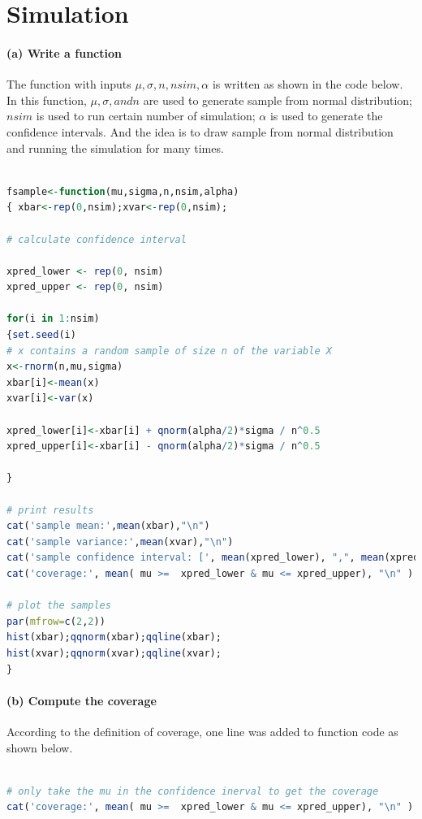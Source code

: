 \documentclass[10pt, letterpaper]{proc}
\begin{document}
\section{Simulation}
\paragraph{(a) Write a function} The function with inputs $\mu, \sigma, n, nsim, \alpha$ is written as shown in the code below. In this function, $\mu, \sigma, and n$ are used to generate sample from normal distribution; $nsim$ is used to run certain number of simulation; $\alpha$ is used to generate the confidence intervals. And the idea is to draw sample from normal distribution and running the simulation for many times.

\begin{lstlisting}[language=R, breaklines=T, basicstyle=\footnotesize\ttfamily]

fsample<-function(mu,sigma,n,nsim,alpha)
{ xbar<-rep(0,nsim);xvar<-rep(0,nsim); 

# calculate confidence interval

xpred_lower <- rep(0, nsim)
xpred_upper <- rep(0, nsim)

for(i in 1:nsim)
{set.seed(i)
# x contains a random sample of size n of the variable X
x<-rnorm(n,mu,sigma)
xbar[i]<-mean(x)
xvar[i]<-var(x)

xpred_lower[i]<-xbar[i] + qnorm(alpha/2)*sigma / n^0.5
xpred_upper[i]<-xbar[i] - qnorm(alpha/2)*sigma / n^0.5

}

# print results
cat('sample mean:',mean(xbar),"\n")
cat('sample variance:',mean(xvar),"\n")
cat('sample confidence interval: [', mean(xpred_lower), ",", mean(xpred_upper), "] \n")
cat('coverage:', mean( mu >=  xpred_lower & mu <= xpred_upper), "\n" )

# plot the samples
par(mfrow=c(2,2))  
hist(xbar);qqnorm(xbar);qqline(xbar);
hist(xvar);qqnorm(xvar);qqline(xvar);
}
\end{lstlisting}

\paragraph{(b) Compute the coverage} According to the definition of coverage, one line was added to function code as shown below. 

\begin{lstlisting}[language=R, breaklines=T, basicstyle=\footnotesize\ttfamily]

# only take the mu in the confidence inerval to get the coverage
cat('coverage:', mean( mu >=  xpred_lower & mu <= xpred_upper), "\n" )

\end{lstlisting}
\end{document}
